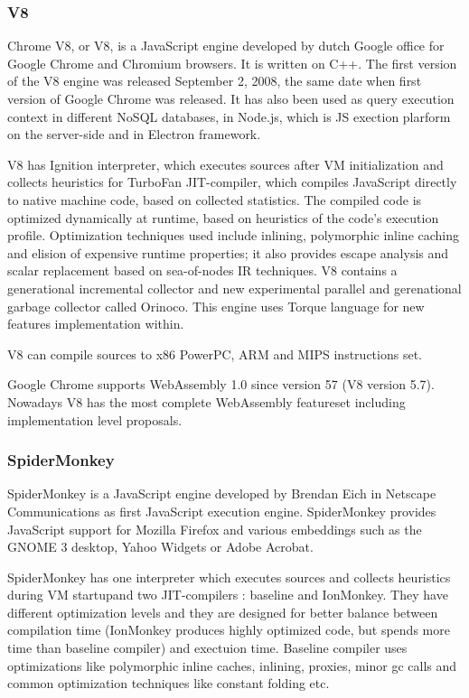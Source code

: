 \subsubsection{V8} \mbox{}

Chrome V8, or V8, is a JavaScript engine developed by dutch Google office for Google Chrome and Chromium browsers. It is written on C++.
The first version of the V8 engine was released September 2, 2008, the same date when first version of Google Chrome was released.
It has also been used as query execution context in different NoSQL databases,
   in Node.js, which is JS exection plarform on the server-side and in Electron framework.

V8 has Ignition interpreter, which executes sources after VM initialization and collects heuristics for TurboFan JIT-compiler,
   which compiles JavaScript directly to native machine code, based on collected statistics.
The compiled code is optimized dynamically at runtime, based on heuristics of the code's execution profile.
Optimization techniques used include inlining, polymorphic inline caching and elision of expensive runtime properties;
   it also provides escape analysis and scalar replacement based on sea-of-nodes IR techniques.
V8 contains a generational incremental collector and new experimental parallel and gerenational garbage collector called Orinoco.
This engine uses Torque language for new features implementation within.  

V8 can compile sources to x86 PowerPC, ARM and MIPS instructions set. \cite{wiki_v8}

Google Chrome supports WebAssembly 1.0 since version 57 (V8 version 5.7).
Nowadays V8 has the most complete WebAssembly featureset including implementation level proposals.

\subsubsection{SpiderMonkey} \mbox{}

SpiderMonkey is a JavaScript engine developed by Brendan Eich in Netscape Communications as first JavaScript execution engine. 
SpiderMonkey provides JavaScript support for Mozilla Firefox and various embeddings such as the GNOME 3 desktop, Yahoo Widgets or Adobe Acrobat.

SpiderMonkey has one interpreter which executes sources and collects heuristics during VM startupand two JIT-compilers : baseline and IonMonkey.
They have different optimization levels and they are designed for better balance between compilation time
   (IonMonkey produces highly optimized code, but spends more time than baseline compiler) and exectuion time.
Baseline compiler uses optimizations like polymorphic inline caches, inlining, proxies, minor gc calls and
   common optimization techniques like constant folding etc.

